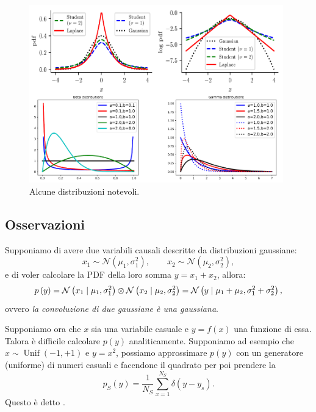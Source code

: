 \documentclass[10pt]{article}
\DeclareMathOperator{\Unif}{Unif}
\newcommand{\pare}[1]{
	\ensuremath{\left(#1\right)}
}
\begin{document}
\begin{figure}
\includegraphics[width=0.98\textwidth]{Images/distributions.PNG}
\caption{Alcune distribuzioni notevoli.}\label{fig:distributions}
\end{figure}

\subsection{Osservazioni}
Supponiamo di avere due variabili causali descritte da distribuzioni gaussiane:
\begin{equation}
x_1 \sim \mathcal{N}\pare{\mu_1, \sigma_1^2},\qquad x_2 \sim \mathcal{N}\pare{\mu_2, \sigma_2^2},
\end{equation}
e di voler calcolare la PDF della loro somma $y = x_1 + x_2$, allora:
\begin{equation}
p\pare{y} = \mathcal{N}\pare{x_1\cond\mu_1, \sigma^2_1} \otimes \mathcal{N}\pare{x_2\cond\mu_2, \sigma^2_2} = \mathcal{N}\pare{y\cond\mu_1 + \mu_2, \sigma^2_1 + \sigma^2_2},
\end{equation}
ovvero \textit{la convoluzione di due gaussiane è una gaussiana}.

Supponiamo ora che $x$ sia una variabile casuale e $y = f\pare{x}$ una funzione
di essa. Talora è difficile calcolare $p\pare{y}$ analiticamente. Supponiamo ad
esempio che $x\sim\Unif\pare{-1,+1}$ e $y=x^2$, possiamo approssimare
$p\pare{y}$ con un generatore (uniforme) di numeri casuali e facendone il
quadrato per poi prendere la 
\begin{equation}
p_S\pare{y} = \frac{1}{N_S}\sum_{x=1}^{N_S}\delta\pare{y-y_s}.
\end{equation}
Questo è detto .
\end{document}
